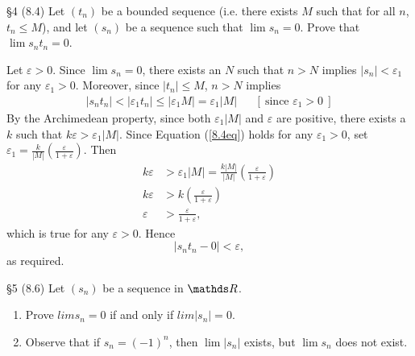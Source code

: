 \documentclass{homework}
\begin{document}
\begin{problem}{\S 4}
  (8.4) Let $(t_n)$ be a bounded sequence (i.e. there exists $M$ such that for all $n$, $t_n\le M$),
  and let $(s_n)$ be a sequence such that $\lim{s_n}=0$. Prove that $\lim{s_nt_n}=0$.
\end{problem}
\begin{solution}
  Let $\varepsilon>0$. Since $\lim{s_n}=0$, there exists an $N$ such that $n>N$ implies $\left| s_n
  \right| <\varepsilon_1$ for any $\varepsilon_1>0$. Moreover, since $\left| t_n \right| \le M$,
  $n>N$ implies
  \begin{align}
    \left| s_nt_n \right| < \left| \varepsilon_1t_n \right| \le \left| \varepsilon_1M \right|
    =\varepsilon_1\left| M \right| && [~\text{since $\varepsilon_1>0$}~] \label{8.4eq}
  \end{align}
  By the Archimedean property, since both $ \varepsilon_1\left| M \right| $ and $ \varepsilon$ are
  positive, there exists a $k$ such that $k\varepsilon>\varepsilon_1\left| M \right| $. Since
  Equation (\ref{8.4eq}) holds for any $\varepsilon_1>0$, set $\varepsilon_1=\frac{k}{\left| M
  \right| }\left( \frac{\varepsilon}{1+\varepsilon}\right) $. Then
  \begin{align*}
    k\varepsilon&>\varepsilon_1\left| M \right| = \frac{k\left| M \right| }{\left| M \right| }\left(
  \frac{\varepsilon}{1+\varepsilon}\right) \\
      k\varepsilon &>k\left( \frac{\varepsilon}{1+\varepsilon} \right) \\
      \varepsilon&>\frac{\varepsilon}{1+\varepsilon}
  ,\end{align*} which is true for any $\varepsilon>0$. Hence \[
    \left| s_nt_n-0 \right| <\varepsilon
  ,\] as required.
\end{solution}

\begin{problem}{\S 5}
  (8.6) Let $(s_n)$ be a sequence in $ \R$.
  \begin{enumerate}[label=(\alph*)]
    \item Prove $lim{s_n}=0$ if and only if $lim{\left| s_n \right| }=0$.
    \item Observe that if $s_n=(-1)^{n}$, then $\lim{\left| s_n \right| }$ exists, but $\lim{s_n}$
      does not exist.
  \end{enumerate}
\end{problem}
\end{document}
